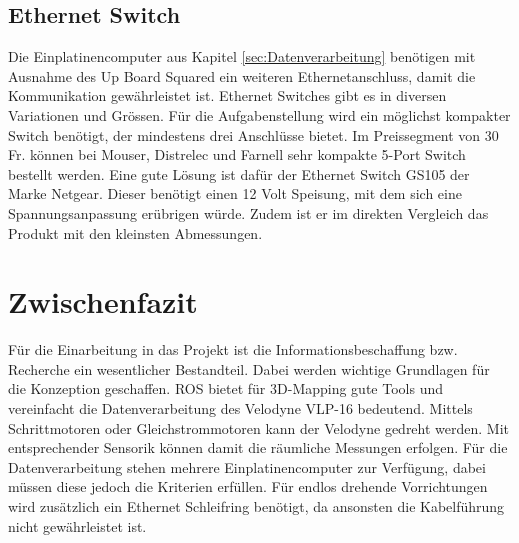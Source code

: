 \subsection{Ethernet Switch}
\label{subsec:Ethernetswitch}
Die Einplatinencomputer aus Kapitel \ref{sec:Datenverarbeitung} benötigen mit Ausnahme des Up Board Squared ein weiteren Ethernetanschluss, damit die Kommunikation gewährleistet ist. Ethernet Switches gibt es in diversen Variationen und Grössen. Für die Aufgabenstellung wird ein möglichst kompakter Switch benötigt, der mindestens drei Anschlüsse bietet. Im Preissegment von 30 Fr. können bei Mouser, Distrelec und Farnell sehr kompakte 5-Port Switch bestellt werden. Eine gute Lösung ist dafür der Ethernet Switch GS105 der Marke Netgear. Dieser benötigt einen 12 Volt Speisung, mit dem sich eine Spannungsanpassung erübrigen würde. Zudem ist er im direkten Vergleich das Produkt mit den kleinsten Abmessungen.

\section{Zwischenfazit}
\label{ZwischenfazitInfo}
Für die Einarbeitung in das Projekt ist die Informationsbeschaffung bzw. Recherche ein wesentlicher Bestandteil. Dabei werden wichtige Grundlagen für die Konzeption geschaffen. ROS bietet für 3D-Mapping gute Tools und vereinfacht die Datenverarbeitung des Velodyne VLP-16 bedeutend. Mittels Schrittmotoren oder Gleichstrommotoren kann der Velodyne gedreht werden. Mit entsprechender Sensorik können damit die räumliche Messungen erfolgen. Für die Datenverarbeitung stehen mehrere Einplatinencomputer zur Verfügung, dabei müssen diese jedoch die Kriterien erfüllen. Für endlos drehende Vorrichtungen wird zusätzlich ein Ethernet Schleifring benötigt, da ansonsten die Kabelführung nicht gewährleistet ist.  

